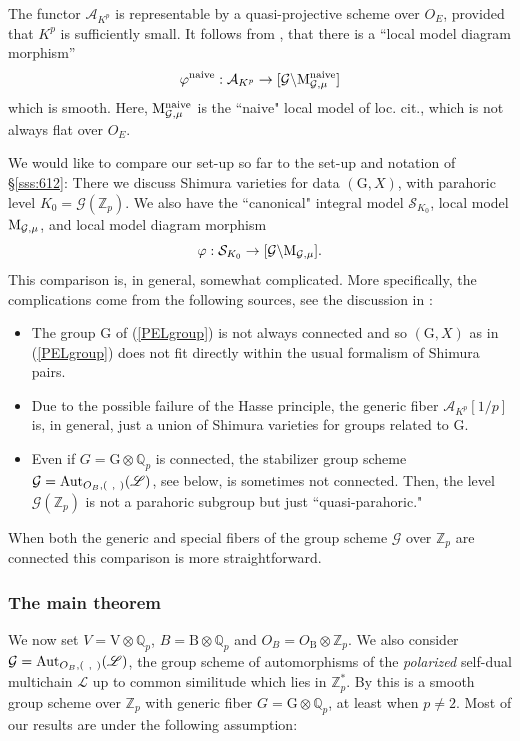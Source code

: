 \documentclass[reqno, 10pt]{amsart}
\makeatletter
\newcommand{\BQ}{\ensuremath{\mathbb {Q}}\xspace}
\newcommand{\BZ}{\ensuremath{\mathbb {Z}}\xspace}
\newcommand{\CA}{\ensuremath{\mathcal {A}}\xspace}
\newcommand{\CG}{\ensuremath{\mathcal {G}}\xspace}
\newcommand{\CS}{\ensuremath{\mathcal {S}}\xspace}
\newcommand{\RB}{\ensuremath{\mathrm {B}}\xspace}
\newcommand{\RG}{\ensuremath{\mathrm {G}}\xspace}
\newcommand{\RV}{\ensuremath{\mathrm {V}}\xspace}
\newcommand{\bs}{\backslash}
\theoremstyle{definition}
\numberwithin{equation}{subsection}
\numberwithin{subsubsection}{subsection}
\renewcommand{\to}{%
   \ifbool{@display}{\longrightarrow}{\rightarrow}%
   }
\newcommand{\Mloc}{{\rm M}}
\makeatother
\begin{document}
The functor ${\CA}_{K^p}$ is representable by a quasi-projective scheme
over ${O}_{E }$, provided that $K^p$ is sufficiently small.
It follows from \cite[\S 3.26]{RZbook}, that there is a ``local model diagram morphism''
 \[
 \varphi^{\rm naive}: \CA_{K^p}\to [\CG\bs \Mloc^{\rm naive}_{\CG,\mu}]
 \]
 which is smooth. Here, $\Mloc^{\rm naive}_{\CG,\mu}$ is the ``naive" local model of loc. cit.,  
 which is not always flat over $O_E$. 
 

We would like to compare our set-up so far to the set-up and notation of \S \ref{sss:612}: 
 There we discuss Shimura varieties for data $(\RG,X)$, with parahoric level $K_0=\CG(\BZ_p)$. We also have
  the ``canonical" integral model $\CS_{K_0}$, local model
 $\Mloc_{\CG,\mu}$, and local model diagram morphism
 \[
 \varphi : \CS_{K_0}\to [\CG\bs \Mloc_{\CG,\mu}].
 \]
This comparison is,  in general, somewhat complicated.   More specifically, the complications come from the following sources, see the discussion in \cite[\S 8.2]{PZ}:
 
 \begin{itemize}
 \item[1)] The group $\RG$ of (\ref{PELgroup}) is not always connected and so $(\RG, X)$ as in (\ref{PELgroup})  does not fit directly within the usual formalism of Shimura pairs.
 
 \item[2)] Due to the possible failure of the Hasse principle, the generic fiber $\CA_{K^p}[1/p]$ is, in general, just a union of Shimura varieties for groups related to $\RG$.
 
 \item[3)] Even if $G=\RG\otimes\BQ_p$ is connected, the stabilizer group scheme  $\CG={\rm Aut}_{O_B, (\ ,\ )}(\mathscr L)$, see below, is sometimes not connected. Then, the level $\CG(\BZ_p)$ is not a parahoric subgroup but just ``quasi-parahoric."  
 \end{itemize}
 
  When both the generic and special fibers of the group scheme $\CG$ over $\BZ_p$ are connected this comparison is more straightforward. 
 
  
  
\subsubsection{The main theorem}\label{sss:MainPEL} We now set $V=\RV\otimes\BQ_p$, $B=\RB\otimes\BQ_p$ and $O_B=O_\RB\otimes\BZ_p$. 
We also consider $\CG={\rm Aut}_{O_B, (\ ,\ )}(\mathscr L)$, the group scheme of automorphisms of the \emph{polarized} self-dual 
multichain $\mathscr L$ up to common similitude which lies in $\BZ_p^*$. By \cite[Thm. 3.16, App. to Ch. 3]{RZbook} this is a smooth group scheme over $\BZ_p$ with generic fiber $G=\RG\otimes\BQ_p$, at least when $p\neq 2$.
Most of our results are under the following assumption:
\smallskip
\end{document}
